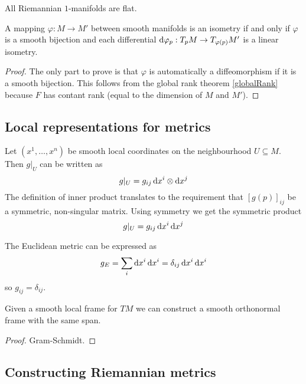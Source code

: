 \begin{lemma}
All Riemannian $1$-manifolds are flat.
\end{lemma}

\begin{lemma}
A mapping $\varphi:M\to M'$ between smooth manifolds is an isometry \textup{if and only if} $\varphi$ is a smooth bijection and each differential $\operatorname{d \!}\varphi_p:T_pM\to T_{\varphi(p)}M'$ is a linear isometry.
\end{lemma}
\begin{proof}
The only part to prove is that $\varphi$ is automatically a diffeomorphism if it is a smooth bijection. This follows from the global rank theorem \ref{globalRank} because $F$ has contant rank (equal to the dimension of $M$ and $M'$).
\end{proof}

\subsection{Local representations for metrics}
Let $(x^1, \ldots, x^n)$ be smooth local coordinates on the neighbourhood $U\subseteq M$. Then $g|_U$ can be written as
\[ g|_U = g_{ij}\operatorname{d \!}{x^i}\otimes\operatorname{d \!}{x^j}  \]
The definition of inner product translates to the requirement that $[g(p)]_{ij}$ be a symmetric, non-singular matrix. Using symmetry we get the symmetric product
\[ g|_U = g_{ij}\operatorname{d \!}{x^i}\operatorname{d \!}{x^j} \]

\begin{example}
The Euclidean metric can be expressed as
\[ g_E = \sum_i\operatorname{d \!}{x^i}\operatorname{d \!}{x^i} = \delta_{ij}\operatorname{d \!}{x^i}\operatorname{d \!}{x^i} \]
so $g_{ij} = \delta_{ij}$.
\end{example}

\begin{proposition}
Given a smooth local frame for $TM$ we can construct a smooth orthonormal frame with the same span.
\end{proposition}
\begin{proof}
Gram-Schmidt.
\end{proof}

\subsection{Constructing Riemannian metrics}
